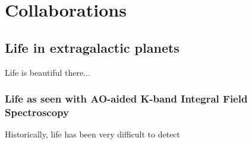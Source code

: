 \chapter{Collaborations}



\section{Life in extragalactic planets}

Life is beautiful there...

\subsection{Life as seen with AO-aided K-band Integral Field Spectroscopy}

Historically, life has been very difficult to detect

